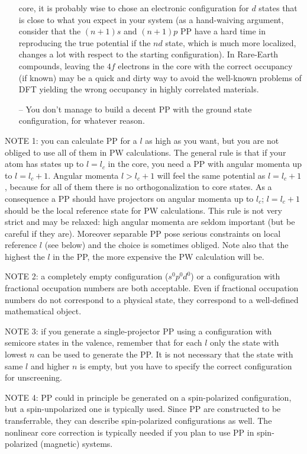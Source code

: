 \begin{enumerate}
   core, it is probably wise to chose an electronic configuration for 
   $d$ states that is close to what you expect in your system (as a
   hand-waiving argument, consider that the $(n+1)s$ and $(n+1)p$ PP 
   have a hard time in reproducing the true potential if the $nd$ state,
   which is much more localized, changes a lot with respect to the
   starting configuration). In Rare-Earth compounds, leaving the $4f$ 
   electrons in the core with the correct occupancy (if known) may be 
   a quick and dirty way to avoid the well-known problems of DFT yielding 
   the wrong occupancy in highly correlated materials.
\item[--]
   You don't manage to build a decent PP with the ground state configuration, 
   for whatever reason.
\end{enumerate}

NOTE 1: you can calculate PP for a $l$ as high as you want, but you
are not obliged to use all of them in PW calculations. The general
rule is that if your atom has states up to $l=l_c$ in the core, you
need a PP with angular momenta up to $l=l_c+1$. Angular momenta
$l>l_c+1$ will feel the same potential as $l=l_c+1$, because
for all of them there is no orthogonalization to core states.
As a consequence a PP should have projectors on angular momenta up to
$l_c$; $l=l_c+1$ should be the local reference state for PW
calculations. This rule is not very strict and may be relaxed: high
angular momenta are seldom important (but be careful if they are). 
Moreover separable PP pose serious constraints on local reference $l$
(see below) and the choice is sometimes obliged. Note also that the
highest the $l$ in the PP, the more expensive the PW calculation will 
be.

NOTE 2: a completely empty configuration ($s^0p^0d^0$) or
a configuration with fractional occupation numbers are both
acceptable. Even if fractional occupation numbers do
not correspond to a physical state, they correspond to a
well-defined mathematical object.

NOTE 3: if you generate a single-projector PP using a configuration
with semicore states in the valence, remember that for each $l$
only the state with lowest $n$ can be used to generate the PP. 
It is not necessary that the state with same $l$ and higher $n$ 
is empty, but you have to specify the correct configuration
for unscreening.

NOTE 4: PP could in principle be generated on a spin-polarized
configuration, but a spin-unpolarized one is typically used.
Since PP are constructed to be transferrable, they can describe
spin-polarized configurations as well. The nonlinear core correction
is typically needed if you plan to use PP in spin-polarized (magnetic)
systems.


